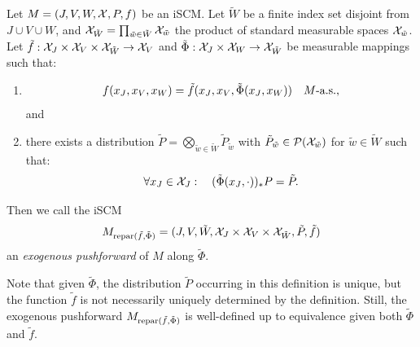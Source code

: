 \begin{Def}\label{def:exogenous_pushforward}
  Let $M = \left ( J, V, W, \mathcal{X}, P, f \right )$ be an iSCM.
  Let $\tilde{W}$ be a finite index set disjoint from $J \cup V \cup W$, and
  $\mathcal{X}_{\tilde{W}} = \prod_{\tilde{w}\in\tilde{W}} \mathcal{X}_{\tilde{w}}$ the product of standard measurable spaces $\mathcal{X}_{\tilde{w}}$. 
  Let $\tilde{f} : \mathcal{X}_{J} \times \mathcal{X}_{V} \times \mathcal{X}_{\tilde{W}} \to \mathcal{X}_{V}$ and $\tilde{\Phi} : \mathcal{X}_J \times \mathcal{X}_W \to \mathcal{X}_{\tilde{W}}$ be measurable mappings such that:
  \begin{enumerate}[label=\roman*)]
    \item $$f(x_J,x_V,x_W) = \tilde{f}(x_J,x_V,\tilde{\Phi}(x_J,x_W)) \quad M\text{-a.s.},$$
    and
    \item there exists a distribution $\tilde{P} = \bigotimes_{\tilde{w}\in\tilde{W}} \tilde{P}_{\tilde{w}}$ with $\tilde{P}_{\tilde{w}} \in \mathcal{P}(\mathcal{X}_{\tilde{w}})$ for $\tilde{w}\in\tilde{W}$ such that:
    $$\forall x_J \in \mathcal{X}_J: \quad (\tilde{\Phi}(x_J,\cdot))_* P = \tilde{P}.$$
  \end{enumerate}
  Then we call the iSCM
  $$M_{\mathrm{repar}({\tilde{f}},{\tilde{\Phi}})} = ( J, V, \tilde{W}, \mathcal{X}_J \times \mathcal{X}_V \times \mathcal{X}_{\tilde{W}}, \tilde{P}, \tilde{f} )$$
  an \emph{exogenous pushforward} of $M$ along $\tilde{\Phi}$.
\end{Def}
Note that given $\tilde{\Phi}$, the distribution $\tilde{P}$ occurring in this definition is unique, but the function $\tilde f$ is not necessarily uniquely determined by the definition.
Still, the exogenous pushforward $M_{\mathrm{repar}({\tilde{f}},{\tilde{\Phi}})}$ is well-defined up to equivalence given both $\tilde{\Phi}$ and $\tilde{f}$.

